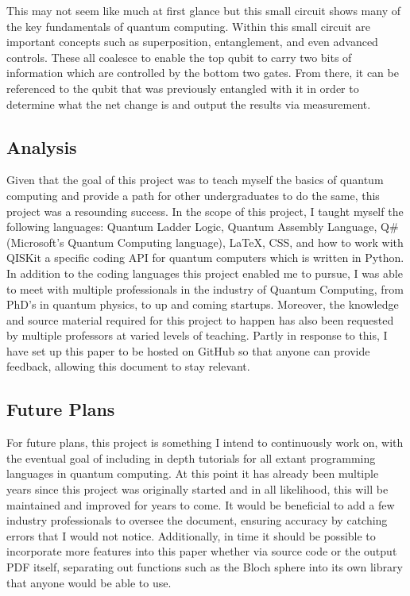 \documentclass[a4paper]{article}
\begin{document}
This may not seem like much at first glance but this small circuit shows many of the key fundamentals of quantum computing.  Within this small circuit are important concepts such as superposition, entanglement, and even advanced controls.  These all coalesce to enable the top qubit to carry two bits of information which are controlled by the bottom two gates. From there, it can be referenced to the qubit that was previously entangled with it in order to determine what the net change is and output the results via measurement.

\subsection{Analysis} %
Given that the goal of this project was to teach myself the basics of quantum computing and provide a path for other undergraduates to do the same, this project was a resounding success.  In the scope of this project, I taught myself the following languages: Quantum Ladder Logic, Quantum Assembly Language, Q\# (Microsoft's Quantum Computing language), LaTeX, CSS, and how to work with QISKit a specific coding API for quantum computers which is written in Python.\newline
\newline
In addition to the coding languages this project enabled me to pursue, I was able to meet with multiple professionals in the industry of Quantum Computing, from PhD's in quantum physics, to up and coming startups.  Moreover, the knowledge and source material required for this project to happen has also been requested by multiple professors at varied levels of teaching.  Partly in response to this, I have set up this paper to be hosted on GitHub so that anyone can provide feedback, allowing this document to stay relevant.

\subsection{Future Plans}
For future plans, this project is something I intend to continuously work on, with the eventual goal of including in depth tutorials for all extant programming languages in quantum computing.  At this point it has already been multiple years since this project was originally started and in all likelihood, this will be maintained and improved for years to come. It would be beneficial to add a few industry professionals to oversee the document, ensuring accuracy by catching errors that I would not notice.  Additionally, in time it should be possible to incorporate more features into this paper whether via source code or the output PDF itself, separating out functions such as the Bloch sphere into its own library that anyone would be able to use.
\end{document}
